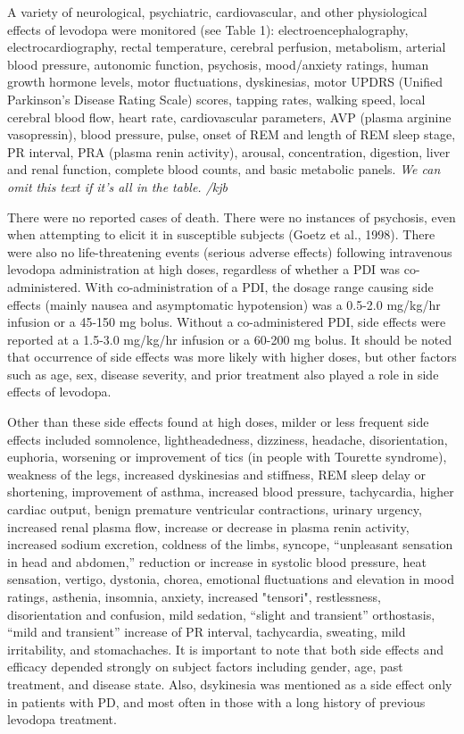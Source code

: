 A variety of neurological, psychiatric, cardiovascular, and other physiological effects of levodopa  were monitored (see Table 1): electroencephalography, electrocardiography, rectal temperature, cerebral perfusion, metabolism, arterial blood pressure, autonomic function, psychosis, mood/anxiety ratings, human growth hormone levels, motor fluctuations, dyskinesias, motor UPDRS (Unified Parkinson’s Disease Rating Scale) scores, tapping rates, walking speed, local cerebral blood flow, heart rate, cardiovascular parameters, AVP (plasma arginine vasopressin), blood pressure, pulse, onset of REM and length of REM sleep stage, PR interval, PRA (plasma renin activity), arousal, concentration, digestion, liver and renal function, complete blood counts, and basic metabolic panels. \textit{We can omit this text if it's all in the table. /kjb}

There were no reported cases of death.  There were no instances of psychosis, even when attempting to elicit it in susceptible subjects (Goetz et al., 1998).  There were also no life-threatening events (serious adverse effects) following intravenous levodopa administration at high doses, regardless of whether a PDI was co-administered.  With co-administration of a PDI, the dosage range causing side effects (mainly nausea and asymptomatic hypotension) was a 0.5-2.0 mg/kg/hr infusion or a 45-150 mg bolus.  Without a co-administered PDI, side effects were reported at a 1.5-3.0 mg/kg/hr infusion or a 60-200 mg bolus. It should be noted that occurrence of side effects was more likely with higher doses, but other factors such as age, sex, disease severity, and prior treatment also played a role in side effects of levodopa.  

Other than these side effects found at high doses, milder or less frequent side effects included somnolence, lightheadedness, dizziness, headache, disorientation, euphoria, worsening or improvement of tics (in people with Tourette syndrome), weakness of the legs, increased dyskinesias and stiffness, REM sleep delay or shortening, improvement of asthma, increased blood pressure, tachycardia, higher cardiac output, benign premature ventricular contractions, urinary urgency, increased renal plasma flow, increase or decrease in plasma renin activity, increased sodium excretion, coldness of the limbs, syncope, “unpleasant sensation in head and abdomen,” reduction or increase in systolic blood pressure, heat sensation, vertigo, dystonia, chorea, emotional fluctuations and elevation in mood ratings, asthenia, insomnia, anxiety, increased "tensori", restlessness, disorientation and confusion, mild sedation, “slight and transient” orthostasis, “mild and transient” increase of PR interval, tachycardia, sweating, mild irritability, and stomachaches.  It is important to note that both side effects and efficacy depended strongly on subject factors including gender, age, past treatment, and disease state.  Also, dsykinesia was mentioned as a side effect only in patients with PD, and most often in those with a long history of previous levodopa treatment.

